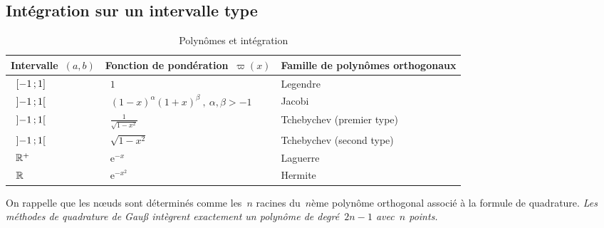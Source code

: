 \subsection*{Intégration sur un intervalle type} 
\begin{table}[ht]\centering\small
\begin{tabular}{lll} Intervalle~$(a,b)$ & Fonction de pondération~$\varpi(x)$ & Famille de polynômes orthogonaux\\ \hline~$\mathopen{[}-1\,;1\mathclose{]}$ &~$1$ & Legendre\\~$\mathopen{]}-1\,;1\mathclose{[}$ &~$(1-x)^\alpha (1+x)^\beta \ , \ \alpha, \beta > -1$ & Jacobi\\~$\mathopen{]}-1\,;1\mathclose{[}$ &~$\frac{1}{\sqrt{1-x^2}}$ &Tchebychev (premier type)\\~$\mathopen{]}-1\,;1\mathclose{[}$ &~$\sqrt{1-x^2}$ & Tchebychev (second type)\\~$\mathbb R^+$ &~$\mathrm{e}^{-x}$ & Laguerre\\~$\mathbb R$ &~$\mathrm{e}^{-x^2}$ & Hermite\\ 
\end{tabular} 
\caption{Polynômes et intégration}
\end{table} 
On rappelle que les nœuds sont déterminés comme les~$n$ racines du~$n$ème polynôme orthogonal associé à la formule de quadrature. 
 \emph{Les méthodes de quadrature de Gauß intègrent exactement un polynôme de degré~$2n-1$ avec~$n$ points.} 
 
